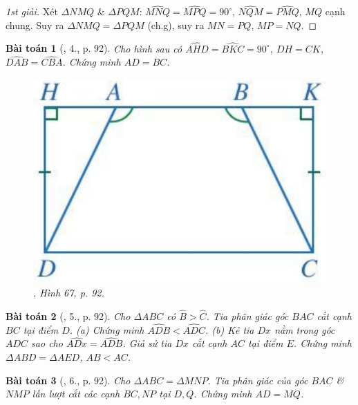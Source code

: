 \documentclass{article}
\newtheorem{baitoan}{Bài toán}
\begin{document}
\begin{proof}[1st giải]
	Xét $\Delta NMQ$ \& $\Delta PQM$: $\widehat{MNQ} = \widehat{MPQ} = 90^\circ$, $\widehat{NQM} = \widehat{PMQ}$, $MQ$ cạnh chung. Suy ra $\Delta NMQ = \Delta PQM$ (ch.g), suy ra $MN = PQ$, $MP = NQ$.
\end{proof}

\begin{baitoan}[\cite{SGK_Toan_7_Canh_Dieu_tap_2}, 4., p. 92]
	Cho hình sau có $\widehat{AHD} = \widehat{BKC} = 90^\circ$, $DH = CK$, $\widehat{DAB} = \widehat{CBA}$. Chứng minh $AD = BC$.
	\begin{figure}[H]
		\centering
		\includegraphics[scale=0.15]{67}
		\caption{\cite{SGK_Toan_7_Canh_Dieu_tap_2}, Hình 67, p. 92.}
	\end{figure}
\end{baitoan}

\begin{baitoan}[\cite{SGK_Toan_7_Canh_Dieu_tap_2}, 5., p. 92]
	Cho $\Delta ABC$ có $\widehat{B} > \widehat{C}$. Tia phân giác góc $BAC$ cắt cạnh $BC$ tại điểm $D$. (a) Chứng minh $\widehat{ADB} < \widehat{ADC}$. (b) Kẻ tia $Dx$ nằm trong góc $ADC$ sao cho $\widehat{ADx} = \widehat{ADB}$. Giả sử tia $Dx$ cắt cạnh $AC$ tại điểm $E$. Chứng minh $\Delta ABD = \Delta AED$, $AB < AC$.
\end{baitoan}

\begin{baitoan}[\cite{SGK_Toan_7_Canh_Dieu_tap_2}, 6., p. 92]
	Cho $\Delta ABC = \Delta MNP$. Tia phân giác của góc $BAC$ \& $NMP$ lần lượt cắt các cạnh $BC,NP$ tại $D,Q$. Chứng minh $AD = MQ$.
\end{baitoan}
\end{document}
